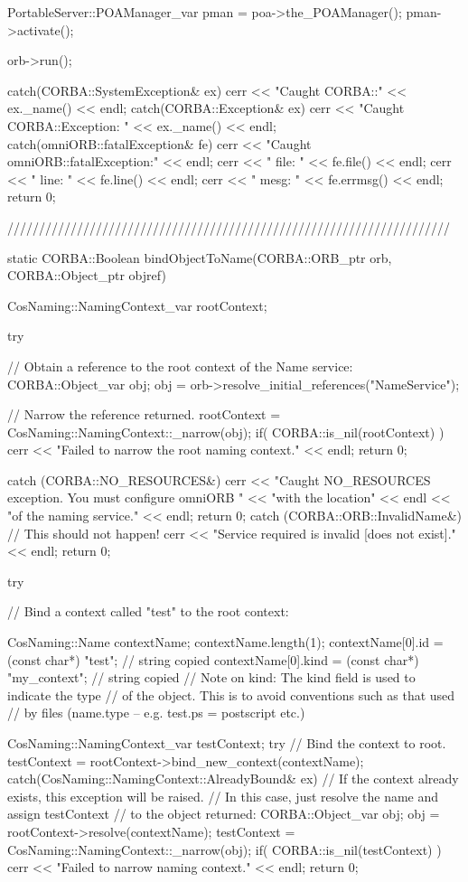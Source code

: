 \documentclass[11pt,twoside,a4paper]{book}
\begin{document}
\begin{cxxlisting}
{{    PortableServer::POAManager_var pman = poa->the_POAManager();
    pman->activate();

    orb->run();
  }
  catch(CORBA::SystemException& ex) {
    cerr << "Caught CORBA::" << ex._name() << endl;
  }
  catch(CORBA::Exception& ex) {
    cerr << "Caught CORBA::Exception: " << ex._name() << endl;
  }
  catch(omniORB::fatalException& fe) {
    cerr << "Caught omniORB::fatalException:" << endl;
    cerr << "  file: " << fe.file() << endl;
    cerr << "  line: " << fe.line() << endl;
    cerr << "  mesg: " << fe.errmsg() << endl;
  }
  return 0;
}

//////////////////////////////////////////////////////////////////////

static CORBA::Boolean
bindObjectToName(CORBA::ORB_ptr orb, CORBA::Object_ptr objref)
{
  CosNaming::NamingContext_var rootContext;

  try {
    // Obtain a reference to the root context of the Name service:
    CORBA::Object_var obj;
    obj = orb->resolve_initial_references("NameService");

    // Narrow the reference returned.
    rootContext = CosNaming::NamingContext::_narrow(obj);
    if( CORBA::is_nil(rootContext) ) {
      cerr << "Failed to narrow the root naming context." << endl;
      return 0;
    }
  }
  catch (CORBA::NO_RESOURCES&) {
    cerr << "Caught NO_RESOURCES exception. You must configure omniORB "
	 << "with the location" << endl
	 << "of the naming service." << endl;
    return 0;
  }
  catch (CORBA::ORB::InvalidName&) {
    // This should not happen!
    cerr << "Service required is invalid [does not exist]." << endl;
    return 0;
  }

  try {
    // Bind a context called "test" to the root context:

    CosNaming::Name contextName;
    contextName.length(1);
    contextName[0].id   = (const char*) "test";       // string copied
    contextName[0].kind = (const char*) "my_context"; // string copied
    // Note on kind: The kind field is used to indicate the type
    // of the object. This is to avoid conventions such as that used
    // by files (name.type -- e.g. test.ps = postscript etc.)

    CosNaming::NamingContext_var testContext;
    try {
      // Bind the context to root.
      testContext = rootContext->bind_new_context(contextName);
    }
    catch(CosNaming::NamingContext::AlreadyBound& ex) {
      // If the context already exists, this exception will be raised.
      // In this case, just resolve the name and assign testContext
      // to the object returned:
      CORBA::Object_var obj;
      obj = rootContext->resolve(contextName);
      testContext = CosNaming::NamingContext::_narrow(obj);
      if( CORBA::is_nil(testContext) ) {
        cerr << "Failed to narrow naming context." << endl;
        return 0;
      }
    }

}}
\end{cxxlisting}
\end{document}
